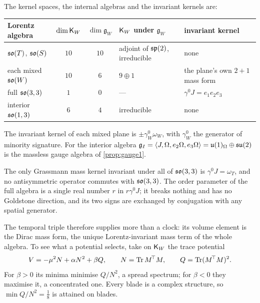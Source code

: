 \begin{theorem}
\label{thm:subkernels}
The kernel spaces, the internal algebras and the invariant kernels are:
\begin{center}
\small\upshape
\begin{tabular}{@{}lccll@{}}
\toprule
Lorentz algebra & $\dim\mathsf K_W$ & $\dim\mathfrak g_W$ & $\mathsf K_W$ under $\mathfrak g_W$ & invariant kernel\\
\midrule
$\mathfrak{so}(T)$, $\mathfrak{so}(S)$ & $10$ & $10$ & adjoint of $\mathfrak{sp}(2)$, irreducible & none\\
each mixed $\mathfrak{so}(W)$ & $10$ & $6$ & $9\oplus1$ & the plane's own $2{+}1$ mass form\\
full $\mathfrak{so}(3,3)$ & $1$ & $0$ & --- & $\gamma^0J=e_1e_2e_3$\\
interior $\mathfrak{so}(1,3)$ & $6$ & $4$ & irreducible & none\\
\bottomrule
\end{tabular}
\end{center}
The invariant kernel of each mixed plane is $\pm\gamma^0_W\omega_W$, with $\gamma^0_W$ the generator of minority signature. For the interior
algebra $\mathfrak g_I=\langle J,\Omega,e_2\Omega,e_3\Omega\rangle=\mathfrak{u}(1)_\Omega\oplus\mathfrak{su}(2)$ is the massless gauge algebra of \cref{prop:gauge1}.
\end{theorem}

\begin{corollary}
\label{cor:fullmass}
The only Grassmann mass kernel invariant under all of $\mathfrak{so}(3,3)$ is $\gamma^0J=\omega_T$, and no antisymmetric operator commutes with
$\mathfrak{so}(3,3)$. The order parameter of the full algebra is a single real number $r$ in $r\gamma^0J$; it breaks nothing and has no Goldstone
direction, and its two signs are exchanged by conjugation with any spatial generator.
\end{corollary}

The temporal triple therefore supplies more than a clock: its volume element is the Dirac mass form, the unique Lorentz-invariant mass term
of the whole algebra. To see what a potential selects, take on $\mathsf K_W$ the trace potential
\begin{equation}
\label{eq:tracepot1}
V=-\mu^2N+\alpha N^2+\beta Q,\qquad N=\operatorname{Tr} M^{\!\top}M,\qquad Q=\operatorname{Tr}(M^{\!\top}M)^2 .
\end{equation}
For $\beta>0$ its minima minimise $Q/N^2$, a spread spectrum; for $\beta<0$ they maximise it, a concentrated one. Every blade is a complex
structure, so $\min Q/N^2=\tfrac18$ is attained on blades.

